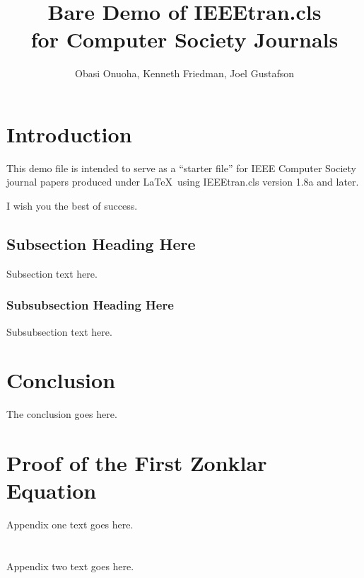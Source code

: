 \documentclass[10pt,journal,compsoc]{IEEEtran}
\begin{document}
	
	\title{Bare Demo of IEEEtran.cls\\ for Computer Society Journals}
	
	
	\author{Obasi Onuoha, Kenneth Friedman, Joel Gustafson}%
	
	
			
		\maketitle
		
		\section{Introduction}
		
		This demo file is intended to serve as a ``starter file''
		for IEEE Computer Society journal papers produced under \LaTeX\ using
		IEEEtran.cls version 1.8a and later.
		
		I wish you the best of success.
		
		
		\subsection{Subsection Heading Here}
		Subsection text here.
		
		
		\subsubsection{Subsubsection Heading Here}
		Subsubsection text here.
		
		
		\section{Conclusion}
		The conclusion goes here.
		
		\appendices
		\section{Proof of the First Zonklar Equation}
		Appendix one text goes here.
		
		\section{}
		Appendix two text goes here.
		
\end{document}
